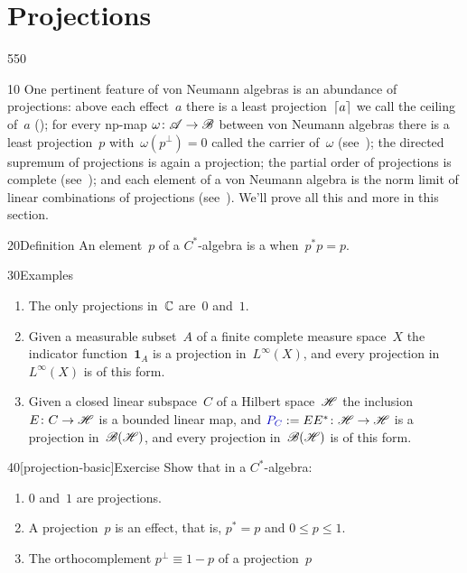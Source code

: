 \section{Projections}
\begin{parsec}{550}%
\begin{point}{10}%
One pertinent feature
of von Neumann algebras
is an abundance of projections:
above each effect~$a$ 
there is a least projection~$\left\lceil a\right\rceil$
we call the ceiling of~$a$ ();
for every np-map $\omega\colon \mathscr{A}\to \mathscr{B}$
between von Neumann algebras
there is a least projection~$p$ with~$\omega(p^\perp)=0$
called the carrier of~$\omega$ (see~);
the directed supremum of projections is again a projection;
the partial order of projections is complete
(see~);
and each element of a von Neumann algebra is the norm limit
of linear combinations of projections
(see~).
We'll prove all this and more in this section.
\end{point}
\begin{point}{20}{Definition}%
An element~$p$ of a $C^*$-algebra
is a %
when~$p^*p=p$.
\end{point}
\begin{point}{30}{Examples}%
\begin{enumerate}
\item
The only projections in~$\mathbb{C}$ are~$0$ and~$1$.
\item
Given a measurable
subset~$A$ of a finite complete measure space~$X$
the indicator function~$\mathbf{1}_A$
is a projection in~$L^\infty(X)$,
and every projection in~$L^\infty(X)$
is of this form.
\item
Given a closed linear subspace~$C$ of a Hilbert space~$\mathscr{H}$
the inclusion $E\colon C\to \mathscr{H}$
is a bounded linear map,
and  $\Define{P_C}:=EE^*\colon \scrH\to\scrH$
is a projection in~$\mathscr{B}(\mathscr{H})$,
and
every projection in~$\mathscr{B}(\mathscr{H})$ is of this form.
\end{enumerate}
\end{point}
\begin{point}{40}[projection-basic]{Exercise}%
Show that in a $C^*$-algebra:
\begin{enumerate}
\item
$0$ and~$1$ are projections.
\item
A projection~$p$ is an effect,
that is, $p^*=p$
and $0\leq p\leq 1$.
\item
The orthocomplement $p^\perp \equiv 1-p$ of a projection~$p$

\end{enumerate}
\end{point}
\end{parsec}
